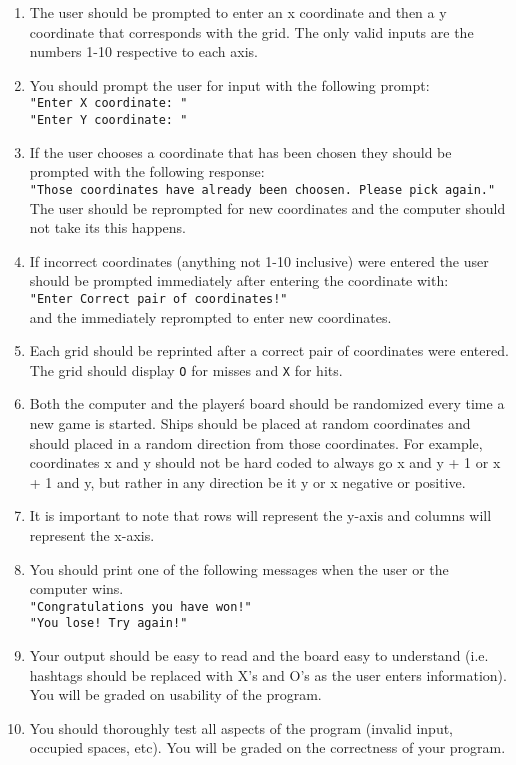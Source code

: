 \documentclass[12pt]{article}
\begin{document}
\begin{enumerate}
\begin{center}
\begin{minipage}{8cm}
\begin{lstlisting}[frame=none, escapechar=@]
\end{lstlisting}
\end{minipage}
\end{center}
	\item  The user should be prompted to enter an x coordinate and then a y coordinate that corresponds with the grid. The only valid inputs are the numbers 1-10 respective to each axis.
	\item You should prompt the user for input with the following prompt:\\
	\texttt{"Enter X coordinate: "}\\
	\texttt{"Enter Y coordinate: "}
	\item If the user chooses a coordinate that has been chosen they should be prompted with the following response:\\
	\texttt{"Those coordinates have already been choosen. Please pick again."}\\
	The user should be reprompted for new coordinates and the computer should not take its this happens.
	\item If incorrect coordinates (anything not 1-10 inclusive) were entered the user should be prompted immediately after entering the coordinate with:\\
     \texttt{"Enter Correct pair of coordinates!"}\\
     and the immediately reprompted to enter new coordinates.
	\item Each grid should be reprinted after a correct pair of coordinates were entered. The grid should display \texttt{O} for misses and \texttt{X} for hits. 
	\item Both the computer and the player\' s board should be randomized every time a new game is started. Ships should be placed at random coordinates and should placed in a random direction from those coordinates. For example, coordinates x and y should not be hard coded to always go x and y + 1  or x + 1 and y, but rather in any direction be it y or x negative or positive.
	\item It is important to note that rows will represent the y-axis and columns will represent the x-axis.
	\item You should print one of the following messages when the user or the computer wins.\\ 
	\texttt{"Congratulations you have won!"} \\
	\texttt{"You lose! Try again!"} \\ 
	\item Your output should be easy to read and the board easy to understand (i.e. hashtags should be replaced with X's and O's as the user enters information). You will be graded on usability of the program.
	\item You should thoroughly test all aspects of the program (invalid input, occupied spaces, etc). You will be graded on the correctness of your program.
\end{enumerate}
\end{document}
